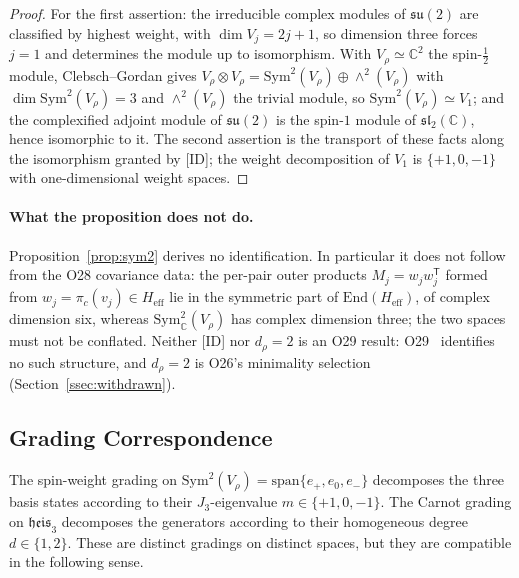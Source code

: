\documentclass[11pt,a4paper]{article}
\newcommand{\Heff}{H_{\mathrm{eff}}}
\newcommand{\su}{\mathfrak{su}}
\newcommand{\heis}{\mathfrak{heis}_3}
\newcommand{\Vr}{V_\rho}
\newcommand{\Sym}{\mathrm{Sym}}
\begin{document}
    \begin{proof}
      For the first assertion: the irreducible complex modules of $\su(2)$ are classified by
      highest weight, with $\dim V_j = 2j + 1$, so dimension three forces $j = 1$ and determines
      the module up to isomorphism.
      With $\Vr \simeq \mathbb{C}^2$ the spin-$\tfrac{1}{2}$ module, Clebsch--Gordan gives
      $\Vr \otimes \Vr = \Sym^2(\Vr) \oplus \wedge^2(\Vr)$ with
      $\dim \Sym^2(\Vr) = 3$ and $\wedge^2(\Vr)$ the trivial module, so
      $\Sym^2(\Vr) \simeq V_1$; and the complexified adjoint module of $\su(2)$ is the spin-$1$
      module of $\mathfrak{sl}_2(\mathbb{C})$, hence isomorphic to it.
      The second assertion is the transport of these facts along the isomorphism granted by [ID];
      the weight decomposition of $V_1$ is $\{+1,0,-1\}$ with one-dimensional weight spaces.
    \end{proof}

    \paragraph{What the proposition does not do.}
      Proposition~\ref{prop:sym2} derives no identification.
      In particular it does not follow from the O28 covariance data: the per-pair outer products
      $M_j = w_j w_j^{\mathsf T}$ formed from $w_j = \pi_c(v_j) \in \Heff$ lie in the symmetric
      part of $\mathrm{End}(\Heff)$, of complex dimension six, whereas
      $\Sym^2_\mathbb{C}(\Vr)$ has complex dimension three; the two spaces must not be conflated.
      Neither [ID] nor $d_\rho = 2$ is an O29 result: O29~\cite{Beau2026a33} identifies no such
      structure, and $d_\rho = 2$ is O26's minimality selection~\cite{Beau2026a30}
      (Section~\ref{ssec:withdrawn}).

  \subsection{Grading Correspondence}
    \label{sec:grading}

    The spin-weight grading on $\Sym^2(\Vr) = \mathrm{span}\{e_+, e_0, e_-\}$ decomposes the three
    basis states according to their $J_3$-eigenvalue $m \in \{+1, 0, -1\}$.
    The Carnot grading on $\heis$ decomposes the generators according to their homogeneous degree
    $d \in \{1, 2\}$.
    These are distinct gradings on distinct spaces, but they are compatible in the following sense.
\end{document}
